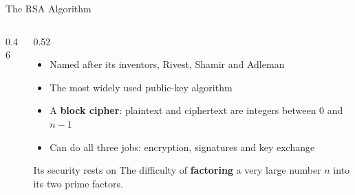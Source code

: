 \documentclass[aspectratio=169,11pt,xcolor={table}]{beamer}
\begin{document}
\begin{frame}{The RSA Algorithm}
  \begin{columns}[c]
    \begin{column}{0.46\textwidth}
      \centering
    \end{column}
    \begin{column}{0.52\textwidth}
      \begin{itemize}\small\setlength{\itemsep}{4pt}
        \item Named after its inventors, Rivest, Shamir and Adleman
        \item The most widely used public-key algorithm
        \item A \textbf{block cipher}: plaintext and ciphertext are integers between $0$ and $n-1$
        \item Can do all three jobs: encryption, signatures and key exchange
      \end{itemize}
      \begin{block}{Its security rests on}
        \small The difficulty of \textbf{factoring} a very large number $n$ into its two prime factors.
      \end{block}
    \end{column}
  \end{columns}
\end{frame}
\end{document}

